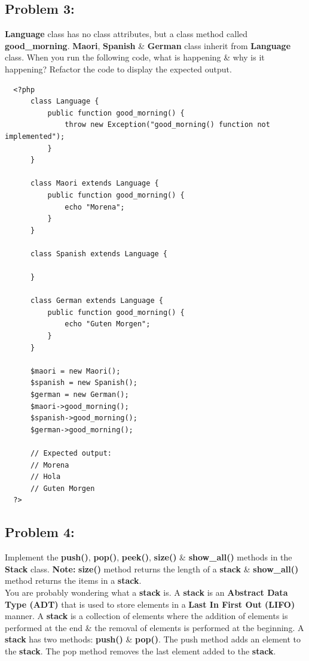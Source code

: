 \documentclass{article}
\begin{document}
\subsection*{Problem 3:} 
\textbf{Language} class has no class attributes, but a class method called \textbf{good\_morning}. \textbf{Maori}, \textbf{Spanish} \& \textbf{German} class inherit from \textbf{Language} class. When you run the following code, what is happening \& why is it happening? Refactor the code to display the expected output.

\begin{verbatim}
  <?php
      class Language {
          public function good_morning() {
              throw new Exception("good_morning() function not implemented");
          }
      }    

      class Maori extends Language {
          public function good_morning() {
              echo "Morena";
          }
      }

      class Spanish extends Language {

      }

      class German extends Language {
          public function good_morning() {
              echo "Guten Morgen";
          }
      }
          
      $maori = new Maori();
      $spanish = new Spanish();
      $german = new German();
      $maori->good_morning();
      $spanish->good_morning();
      $german->good_morning();

      // Expected output:
      // Morena
      // Hola
      // Guten Morgen
  ?>
\end{verbatim} 

\subsection*{Problem 4:} 
Implement the \textbf{push()}, \textbf{pop()}, \textbf{peek()}, \textbf{size()} \& \textbf{show\_all()} methods in the \textbf{Stack} class. \textbf{Note:} \textbf{size()} method returns the length of a \textbf{stack} \& \textbf{show\_all()} method returns the items in a \textbf{stack}. \\

You are probably wondering what a \textbf{stack} is. A \textbf{stack} is an \textbf{Abstract Data Type (ADT)} that is used to store elements in a \textbf{Last In First Out (LIFO)} manner. A \textbf{stack} is a collection of elements where the addition of elements is performed at the end \& the removal of elements is performed at the beginning. A \textbf{stack} has two methods: \textbf{push()} \& \textbf{pop()}. The push method adds an element to the \textbf{stack}. The pop method removes the last element added to the \textbf{stack}. \\
\end{document}
